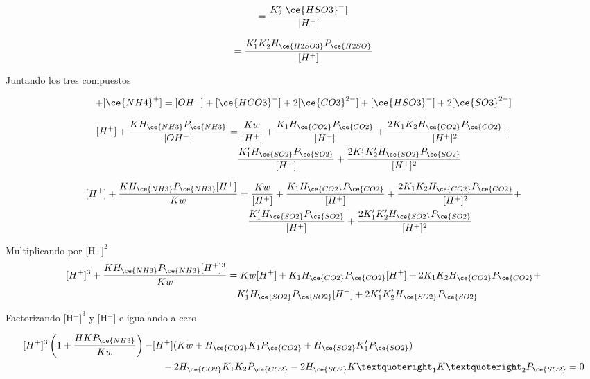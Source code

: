 \begin{equation*}
[\ce{SO3}^{2-}] =\frac{K'_2[\ce{HSO3}^-]} {[H^+]} 
\end{equation*}

\begin{equation*}
[\ce{SO3}^{2-}] =\frac{K'_1K'_2H_{\ce{H2SO3}}P_{\ce{H2SO}}} {[H^+]}
\end{equation*}

Juntando los tres compuestos

\begin{equation*}
[H^+] + [\ce{NH4}^+] = [OH^-]+[\ce{HCO3}^-]+2[\ce{CO3}^{2-}]+[\ce{HSO3}^-]+2[\ce{SO3}^{2-}]
\end{equation*}

 \begin{equation*}
\begin{split}
[H^+] + \frac{KH_{\ce{NH3}}P_{\ce{NH3}}}{[OH^-]} &= \frac{Kw}{[H^+]} + \frac{K_1H_{\ce{CO2}}P_{\ce{CO2}}}{[H^+]} +\frac{2K_1K_2H_{\ce{CO2}}P_{\ce{CO2}}}{[H^+]^2} + \\
&\quad\frac{K'_1H_{\ce{SO2}}P_{\ce{SO2}}} {[H^+]} + \frac{2K'_1K'_2H_{\ce{SO2}}P_{\ce{SO2}}}{[H^+]^2}
\end{split}
\end{equation*}



 \begin{equation*}
\begin{split}
[H^+] + \frac{KH_{\ce{NH3}}P_{\ce{NH3}}[H^+]}{Kw} &= \frac{Kw}{[H^+]} + \frac{K_1H_{\ce{CO2}}P_{\ce{CO2}}}{[H^+]} +\frac{2K_1K_2H_{\ce{CO2}}P_{\ce{CO2}}}{[H^+]^2} +\\ &\quad\frac{K'_1H_{\ce{SO2}}P_{\ce{SO2}}} {[H^+]} + \frac{2K'_1K'_2H_{\ce{SO2}}P_{\ce{SO2}}}{[H^+]^2}
\end{split}
\end{equation*}

Multiplicando por [H$^+]^2$
 \begin{equation*}
\begin{split}
[H^+]^3 + \frac{KH_{\ce{NH3}}P_{\ce{NH3}}[H^+]^3}{Kw} &= Kw [H^+] + K_1H_{\ce{CO2}}P_{\ce{CO2}}[H^+] + 2K_1K_2H_{\ce{CO2}}P_{\ce{CO2}} +\\ &\quad K'_1H_{\ce{SO2}}P_{\ce{SO2}}[H^+] + 2K'_1K'_2H_{\ce{SO2}}P_{\ce{SO2}}
\end{split}
\end{equation*}

Factorizando [H$^+]^3$ y [H$^+$] e igualando a cero

\begin{equation*}
\begin{split}
[H^+]^3 \left( 1 + \frac{HKP_{\ce{NH3}}}{Kw}\right)-&[H^+] (Kw + H_{\ce{CO2}} K_1 P_{\ce{CO2}} + H_{\ce{SO2}}K'_1 P_{\ce{SO2}})\\ &\quad -2 H_{\ce{CO2}}K_1K_2P_{\ce{CO2}} -2H_{\ce{SO2}}K’_1K’_2P_{\ce{SO2}} = 0
\end{split}
\end{equation*}

